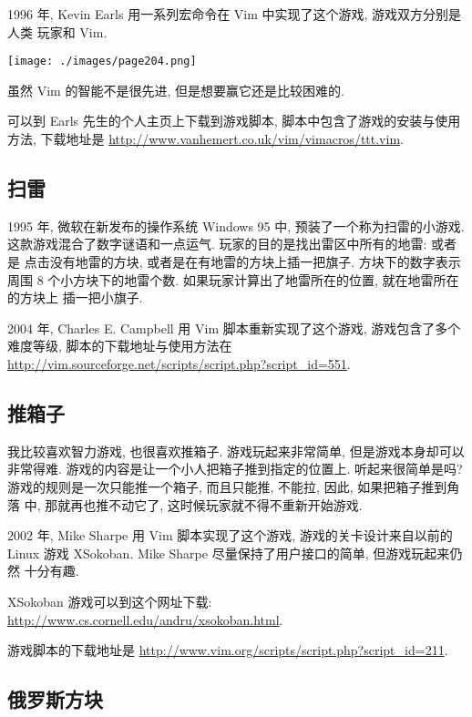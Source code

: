 1996 年, Kevin Earls 用一系列宏命令在 Vim 中实现了这个游戏, 游戏双方分别是人类
玩家和 Vim.

\begin{center}
    \texttt{[image: ./images/page204.png]}
\end{center}

虽然 Vim 的智能不是很先进, 但是想要赢它还是比较困难的.

可以到 Earls 先生的个人主页上下载到游戏脚本, 脚本中包含了游戏的安装与使用方法,
下载地址是 \url{http://www.vanhemert.co.uk/vim/vimacros/ttt.vim}.

\subsection{扫雷}
\label{subsec:mines}

1995 年, 微软在新发布的操作系统 Windows 95 中, 预装了一个称为扫雷的小游戏.
这款游戏混合了数字谜语和一点运气. 玩家的目的是找出雷区中所有的地雷: 或者是
点击没有地雷的方块, 或者是在有地雷的方块上插一把旗子. 方块下的数字表示周围
8 个小方块下的地雷个数. 如果玩家计算出了地雷所在的位置, 就在地雷所在的方块上
插一把小旗子.

2004 年, Charles E. Campbell 用 Vim 脚本重新实现了这个游戏, 游戏包含了多个
难度等级, 脚本的下载地址与使用方法在
\url{http://vim.sourceforge.net/scripts/script.php?script_id=551}.

\subsection{推箱子}
\label{subsec:sokoban}

我比较喜欢智力游戏, 也很喜欢推箱子. 游戏玩起来非常简单, 但是游戏本身却可以
非常得难. 游戏的内容是让一个小人把箱子推到指定的位置上. 听起来很简单是吗?
游戏的规则是一次只能推一个箱子, 而且只能推, 不能拉, 因此, 如果把箱子推到角落
中, 那就再也推不动它了, 这时候玩家就不得不重新开始游戏.

2002 年, Mike Sharpe 用 Vim 脚本实现了这个游戏, 游戏的关卡设计来自以前的
Linux 游戏 XSokoban. Mike Sharpe 尽量保持了用户接口的简单, 但游戏玩起来仍然
十分有趣.

\begin{warning}
    XSokoban 游戏可以到这个网址下载:
    \url{http://www.cs.cornell.edu/andru/xsokoban.html}.
\end{warning}

游戏脚本的下载地址是 \url{http://www.vim.org/scripts/script.php?script_id=211}.

\subsection{俄罗斯方块}
\label{subsec:tetris}

